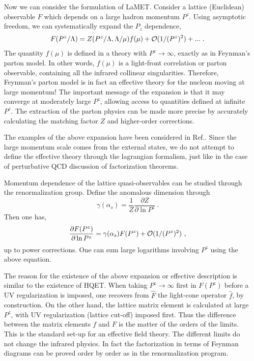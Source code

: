 \documentclass[aps,prd,preprint,tightenlines,superscriptaddress]{revtex4}
\begin{document}
Now we can consider the formulation of LaMET. Consider a lattice (Euclidean) observable $F$ which depends
on a large hadron momentum $P^z$. Using asymptotic freedom, we can systematically
expand the $P_z$ dependence,
\begin{equation}
             F(P^z/\Lambda) = Z(P^z/\Lambda, \Lambda/\mu)f(\mu) + {\cal O}(1/(P^z)^2)+ ... \ . 
\label{Eq:Expansion}
\end{equation}
The quantity $f(\mu)$ is defined in a theory with $P^z\rightarrow \infty$, exactly
as in Feynman's parton model. In other words, $f(\mu)$ is a light-front correlation or parton observable, 
containing all the infrared collinear singularities.
Therefore, Feynman's parton model is in fact an effective theory for the nucleon moving at large momentum!
The important message of the expansion is that it may converge at moderately large $P^z$, allowing
access to quantities defined at infinite $P^z$. The extraction of the parton physics 
can be made more precise by accurately calculating the matching factor $Z$ and higher-order corrections.

The examples of the above expansion have been considered in Ref.\cite{Ji:2013dva, Ji:2013fga}. 
Since the large momentum scale comes from the external states, we do not attempt to define
the effective theory through the lagrangian formalism, just like in the case of perturbative QCD
discussion of factorization theorems.


Momentum dependence of the lattice quasi-observables can be studied through the
renormalization group. Define the anomalous dimension through
\begin{equation}
            \gamma(\alpha_s) = \frac{1}{Z}\frac{\partial Z}{\partial \ln P^z} \ .
\end{equation}
Then one has,
\begin{equation}
            \frac{\partial F(P^z)}{\partial \ln P^z} = \gamma(\alpha_s) F(P^z) + {\cal O}(1/(P^z)^2) \ ,
\end{equation}
up to power corrections. One can sum large logarithms involving $P^z$ using the above equation.


The reason for the existence of the above expansion or effective description is similar to the
existence of HQET. When taking $P^z\rightarrow \infty$ first in $F(P^z)$ before a UV regularization is imposed,
one recovers from $\hat F$ the light-cone operator $\hat f$, by construction. On the other hand, the lattice matrix
element is calculated at large $P^z$, with UV regularization (lattice cut-off) imposed first. Thus the difference
between the matrix elements $f$ and $F$ is the matter of the orders of the limits. This is the standard set-up
for an effective field theory. The different limits do not change the infrared physics. In fact the
factorization in terms of Feynman diagrams can be proved order by order as in the renormalization program.
\end{document}
